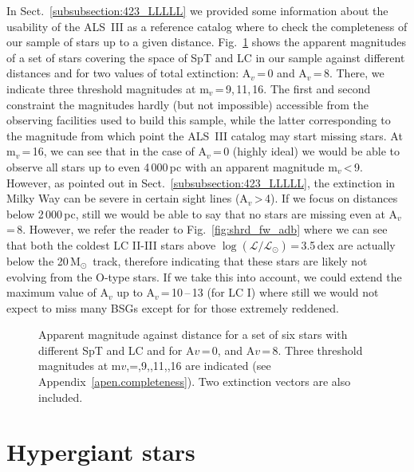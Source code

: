 \documentclass{aa}
\newcommand{\MSol}{\mbox{M$_\odot$}}
\newcommand{\logLs}{$\log (\mathcal{L}/\mathcal{L}_{\odot})$}
\begin{document}
\begin{appendix}
In Sect.~\ref{subsubsection:423_LLLLL} we provided some information about the usability of the ALS~III as a reference catalog where to check the completeness of our sample of stars up to a given distance. Fig.~\ref{fig:extinction} shows the apparent magnitudes of a set of stars covering the space of SpT and LC in our sample against different distances and for two values of total extinction: A$_{v}$\,=\,0 and A$_{v}$\,=\,8. There, we indicate three threshold magnitudes at m$_{v}$\,=\,9,\,11,\,16. The first and second constraint the magnitudes hardly (but not impossible) accessible from the observing facilities used to build this sample, while the latter corresponding to the magnitude from which point the ALS~III catalog may start missing stars. At m$_{v}$\,=\,16, we can see that in the case of A$_{v}$\,=\,0 (highly ideal) we would be able to observe all stars up to even 4\,000\,pc with an apparent magnitude m$_{v}$\,<\,9. However, as pointed out in Sect.~\ref{subsubsection:423_LLLLL}, the extinction in Milky Way can be severe in certain sight lines (A$_{v}$\,>\,4). If we focus on distances below 2\,000\,pc, still we would be able to say that no stars are missing even at A$_{v}$\,=\,8. However, we refer the reader to Fig.~\ref{fig:shrd_fw_adb} where we can see that both the coldest LC II-III stars above \logLs\,=\,3.5\,dex are actually below the 20\,\MSol\ track, therefore indicating that these stars are likely not evolving from the O-type stars. If we take this into account, we could extend the maximum value of A$_{v}$ up to A$_{v}$\,=\,10\,--\,13 (for LC I) where still we would not expect to miss many BSGs except for for those extremely reddened.

\begin{figure}[!t]
\centering
{}
\caption{Apparent magnitude against distance for a set of six stars with different SpT and LC and for A${v}$\,=\,0, and A${v}$\,=\,8. Three threshold magnitudes at m${v}$,=,9,,11,,16 are indicated (see Appendix~\ref{apen.completeness}). Two extinction vectors are also included.} 
\label{fig:extinction}
\end{figure}


\section{Hypergiant stars}
\label{apen.hypergiants}


\end{appendix}
\end{document}
